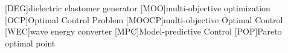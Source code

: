 \begin{acronym}
	[DEG]{dielectric elastomer generator}
	[MOO]{multi-objective optimization}
	[OCP]{Optimal Control Problem}
	[MOOCP]{multi-objective Optimal Control}
	[WEC]{wave energy converter}
	[MPC]{Model-predictive Control}
	[POP]{Pareto optimal point}
\end{acronym}